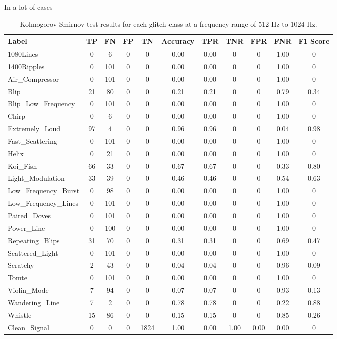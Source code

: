 \documentclass[12pt]{article}
\begin{document}
\medskip
\noindent In a lot of cases

\begin{table}[H]
  \begin{tabular}{lcccccccccc}
  \toprule
  Label & TP & FN & FP & TN & Accuracy & TPR & TNR & FPR & FNR & F1 Score \\
  \midrule
  1080Lines & 0 & 6 & 0 & 0 & 0.00 & 0.00 & 0 & 0 & 1.00 & 0 \\
  1400Ripples & 0 & 101 & 0 & 0 & 0.00 & 0.00 & 0 & 0 & 1.00 & 0 \\
  Air\_Compressor & 0 & 101 & 0 & 0 & 0.00 & 0.00 & 0 & 0 & 1.00 & 0 \\
  Blip & 21 & 80 & 0 & 0 & 0.21 & 0.21 & 0 & 0 & 0.79 & 0.34 \\
  Blip\_Low\_Frequency & 0 & 101 & 0 & 0 & 0.00 & 0.00 & 0 & 0 & 1.00 & 0 \\
  Chirp & 0 & 6 & 0 & 0 & 0.00 & 0.00 & 0 & 0 & 1.00 & 0 \\
  Extremely\_Loud & 97 & 4 & 0 & 0 & 0.96 & 0.96 & 0 & 0 & 0.04 & 0.98 \\
  Fast\_Scattering & 0 & 101 & 0 & 0 & 0.00 & 0.00 & 0 & 0 & 1.00 & 0 \\
  Helix & 0 & 21 & 0 & 0 & 0.00 & 0.00 & 0 & 0 & 1.00 & 0 \\
  Koi\_Fish & 66 & 33 & 0 & 0 & 0.67 & 0.67 & 0 & 0 & 0.33 & 0.80 \\
  Light\_Modulation & 33 & 39 & 0 & 0 & 0.46 & 0.46 & 0 & 0 & 0.54 & 0.63 \\
  Low\_Frequency\_Burst & 0 & 98 & 0 & 0 & 0.00 & 0.00 & 0 & 0 & 1.00 & 0 \\
  Low\_Frequency\_Lines & 0 & 101 & 0 & 0 & 0.00 & 0.00 & 0 & 0 & 1.00 & 0 \\
  Paired\_Doves & 0 & 101 & 0 & 0 & 0.00 & 0.00 & 0 & 0 & 1.00 & 0 \\
  Power\_Line & 0 & 100 & 0 & 0 & 0.00 & 0.00 & 0 & 0 & 1.00 & 0 \\
  Repeating\_Blips & 31 & 70 & 0 & 0 & 0.31 & 0.31 & 0 & 0 & 0.69 & 0.47 \\
  Scattered\_Light & 0 & 101 & 0 & 0 & 0.00 & 0.00 & 0 & 0 & 1.00 & 0 \\
  Scratchy & 2 & 43 & 0 & 0 & 0.04 & 0.04 & 0 & 0 & 0.96 & 0.09 \\
  Tomte & 0 & 101 & 0 & 0 & 0.00 & 0.00 & 0 & 0 & 1.00 & 0 \\
  Violin\_Mode & 7 & 94 & 0 & 0 & 0.07 & 0.07 & 0 & 0 & 0.93 & 0.13 \\
  Wandering\_Line & 7 & 2 & 0 & 0 & 0.78 & 0.78 & 0 & 0 & 0.22 & 0.88 \\
  Whistle & 15 & 86 & 0 & 0 & 0.15 & 0.15 & 0 & 0 & 0.85 & 0.26 \\
  Clean\_Signal & 0 & 0 & 0 & 1824 & 1.00 & 0.00 & 1.00 & 0.00 & 0.00 & 0 \\
  \bottomrule
  \end{tabular}
  \caption{Kolmogorov-Smirnov test results for each glitch class at a frequency range of 512 Hz to 1024 Hz.}
  \label{tab:ks_high_frequency_results}
\end{table}
\end{document}
